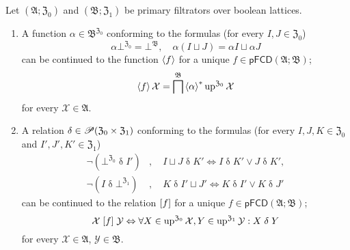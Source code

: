 \begin{thm}
\label{pf-cont}Let $(\mathfrak{A};\mathfrak{Z}_{0})$ and $(\mathfrak{B};\mathfrak{Z}_{1})$
be primary filtrators over boolean lattices.
\begin{enumerate}
\item \label{pf-cont-f}A function $\alpha\in\mathfrak{B}^{\mathfrak{Z}_{0}}$
conforming to the formulas (for every $I,J\in\mathfrak{Z}_{0}$)
\[
\alpha\bot^{\mathfrak{Z}_{0}}=\bot^{\mathfrak{B}},\quad\alpha(I\sqcup J)=\alpha I\sqcup\alpha J
\]
can be continued to the function $\left\langle f\right\rangle$ for a unique $f\in\mathsf{pFCD}(\mathfrak{A};\mathfrak{B})$;
\begin{equation}
\left\langle f\right\rangle\mathcal{X}=\bigsqcap^{\mathfrak{B}}\left\langle \alpha\right\rangle ^{\ast}\operatorname{up}^{\mathfrak{Z}_{0}}\mathcal{X}\label{pf-alpha-filter}
\end{equation}
for every $\mathcal{X}\in\mathfrak{A}$.
\item \label{pf-cont-r}A relation $\delta\in\mathscr{P}(\mathfrak{Z}_{0}\times\mathfrak{Z}_{1})$
conforming to the formulas (for every $I,J,K\in\mathfrak{Z}_{0}$
and $I',J',K'\in\mathfrak{Z}_{1}$)
\begin{equation}
\begin{aligned}\lnot(\bot^{\mathfrak{Z}_{0}}\mathrel\delta I') & ,\quad I\sqcup J\mathrel\delta K'\Leftrightarrow I\mathrel\delta K'\lor J\mathrel\delta K',\\
\lnot(I\mathrel\delta\bot^{\mathfrak{Z}_{1}}) & ,\quad K\mathrel\delta I'\sqcup J'\Leftrightarrow K\mathrel\delta I'\lor K\mathrel\delta J'
\end{aligned}
\label{pf-delta-props}
\end{equation}
can be continued to the relation $\mathrel{\left[f\right]}$ for a unique $f\in\mathsf{pFCD}(\mathfrak{A};\mathfrak{B})$;
\begin{equation}
\mathcal{X}\mathrel{\left[f\right]}\mathcal{Y}\Leftrightarrow\forall X\in\operatorname{up}^{\mathfrak{Z}_{0}}\mathcal{X},Y\in\operatorname{up}^{\mathfrak{Z}_{1}}\mathcal{Y}:X\mathrel\delta Y\label{pf-suprel-delta}
\end{equation}
for every $\mathcal{X}\in\mathfrak{A}$, $\mathcal{Y}\in\mathfrak{B}$.
\end{enumerate}
\end{thm}
